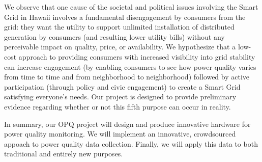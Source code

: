 We observe that one cause of the societal and political issues involving the Smart Grid in Hawaii involves a fundamental disengagement by consumers from the grid: they want the utility to support unlimited installation of distributed generation by consumers (and resulting lower utility bills) without any perceivable impact on quality, price, or availability.  We hypothesize that a low-cost approach to providing consumers with increased visibility into grid stability can increase engagement (by enabling consumers to see how power quality varies from time to time and from neighborhood to neighborhood) followed by active participation (through policy and civic engagement) to create a Smart Grid satisfying everyone's needs.  Our project is designed to provide preliminary evidence regarding whether or not this fifth purpose can occur in reality.

In summary, our OPQ project will design and produce innovative hardware for power quality monitoring. We will implement an innovative, crowdsourced appoach to power quality data collection. Finally, we will apply this data to both traditional and entirely new purposes.   